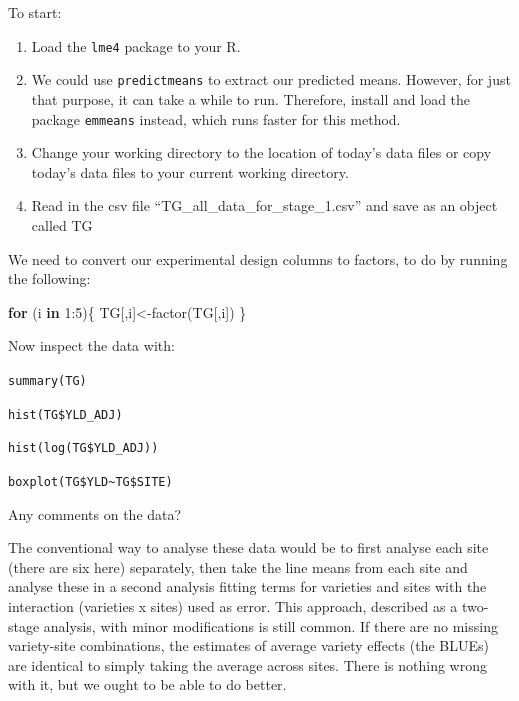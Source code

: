 \documentclass[
]{book}
\newenvironment{Shaded}{\begin{snugshade}}{\end{snugshade}}
\newcommand{\ControlFlowTok}[1]{\textcolor[rgb]{0.13,0.29,0.53}{\textbf{#1}}}
\newcommand{\DecValTok}[1]{\textcolor[rgb]{0.00,0.00,0.81}{#1}}
\newcommand{\FunctionTok}[1]{\textcolor[rgb]{0.00,0.00,0.00}{#1}}
\newcommand{\NormalTok}[1]{#1}
\newcommand{\OtherTok}[1]{\textcolor[rgb]{0.56,0.35,0.01}{#1}}
\newcommand{\SpecialCharTok}[1]{\textcolor[rgb]{0.00,0.00,0.00}{#1}}
\begin{document}
To start:

\begin{enumerate}
\def\labelenumi{\arabic{enumi}.}
\item
  Load the \texttt{lme4} package to your R.
\item
  We could use \texttt{predictmeans} to extract our predicted means. However, for just that purpose, it can take a while to run. Therefore, install and load the package \texttt{emmeans} \citep{R-emmeans} instead, which runs faster for this method.
\item
  Change your working directory to the location of today's data files or copy today's data files to your current working directory.
\item
  Read in the csv file ``TG\_all\_data\_for\_stage\_1.csv'' and save as an object called TG
\end{enumerate}

We need to convert our experimental design columns to factors, to do by running the following:

\begin{Shaded}
\begin{Highlighting}[]
\ControlFlowTok{for}\NormalTok{ (i }\ControlFlowTok{in} \DecValTok{1}\SpecialCharTok{:}\DecValTok{5}\NormalTok{)\{}
\NormalTok{  TG[,i]}\OtherTok{\textless{}{-}}\FunctionTok{factor}\NormalTok{(TG[,i])}
\NormalTok{\}}
\end{Highlighting}
\end{Shaded}

Now inspect the data with:

\texttt{summary(TG)}

\texttt{hist(TG\$YLD\_ADJ)}

\texttt{hist(log(TG\$YLD\_ADJ))}

\texttt{boxplot(TG\$YLD\textasciitilde{}TG\$SITE)}

Any comments on the data?

The conventional way to analyse these data would be to first analyse each site (there are six here) separately, then take the line means from each site and analyse these in a second analysis fitting terms for varieties and sites with the interaction (varieties x sites) used as error. This approach, described as a two-stage analysis, with minor modifications is still common. If there are no missing variety-site combinations, the estimates of average variety effects (the BLUEs) are identical to simply taking the average across sites. There is nothing wrong with it, but we ought to be able to do better.
\end{document}
